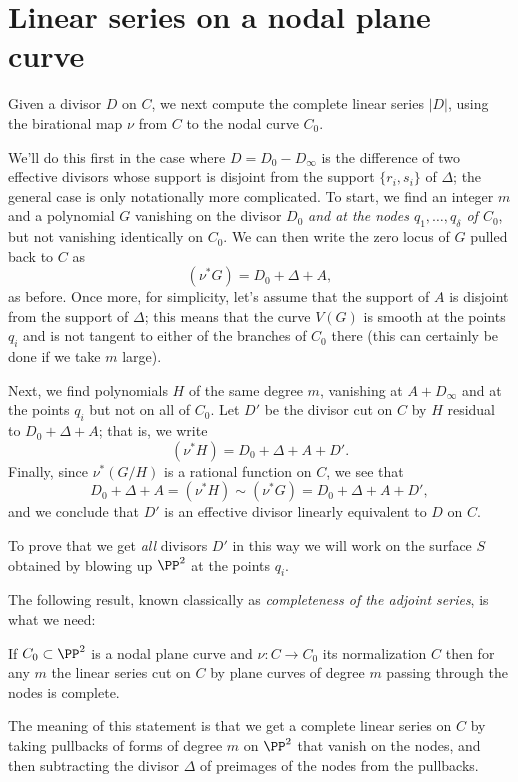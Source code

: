 \section{Linear series on a nodal plane curve}\label{linear series on nodal plane curves}

Given a divisor $D$ on $C$, we next compute the complete linear series $|D|$, using the birational map $\nu$ from 
$C$ to the nodal curve $C_0$.

We'll do this first in the case where $D = D_0-D_\infty$ is the difference of two effective divisors whose support is disjoint from the support $\{r_i, s_i\}$ of $\Delta$; the general case is only notationally more complicated. To start, we find an integer $m$ and a polynomial $G$ vanishing on the divisor $D_0$ \emph{and at the nodes $q_1,\dots,q_\delta$ of $C_0$}, but not vanishing identically on $C_0$. We can then write the zero locus of $G$ pulled back to $C$ as
$$
(\nu^*G) = D_0 + \Delta + A,
$$
as before. Once more, 
 for simplicity, let's assume that the support of $A$ is disjoint from the support of $\Delta$; this means 
  that the curve $V(G)$ is smooth at the points $q_i$ and is not tangent to either of the branches of $C_0$ there (this can certainly be done if we take $m$ large).

Next, we find polynomials $H$ of the same degree $m$, vanishing at $A+D_\infty$ and at the points $q_i$  but not on all of $C_0$. Let $D'$ be the divisor cut on $C$ by $H$ residual to $D_0 + \Delta + A$; that is, we write
$$
(\nu^*H) = D_0 + \Delta + A + D'.
$$
Finally, since $\nu^*(G/H)$ is a rational function on $C$, we see that 
$$
D_0 + \Delta + A = (\nu^*H) \sim (\nu^*G) = D_0 + \Delta + A + D',
$$
and we conclude that $D'$ is an effective divisor linearly equivalent to $D$ on $C$.

To prove that we get \emph{all} divisors $D'$ in this way we will work on the surface $S$ obtained by blowing up
$\PP^2$ at the points $q_i$. 

The following result, known classically as \emph{completeness of the adjoint series}, is what we need:

\begin{proposition}\label{adjoint completeness}
If $C_0 \subset \PP^2$ is a nodal plane curve and $\nu : C \to C_0$ its normalization $C$ then for any $m$ the linear series cut on $C$ by plane curves of degree $m$ passing through the nodes is complete.
\end{proposition}

The  meaning of this statement is that we get a complete linear series on $C$ by taking pullbacks of forms of degree $m$ on $\PP^2$
that vanish on the nodes, and then subtracting the divisor $\Delta$ of preimages of the nodes from the pullbacks.


